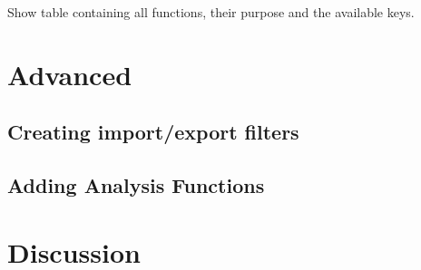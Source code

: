 Show table containing all functions, their purpose and the available keys.

\section{Advanced}

\subsection{Creating import/export filters}

\subsection{Adding Analysis Functions}

\section{Discussion}

